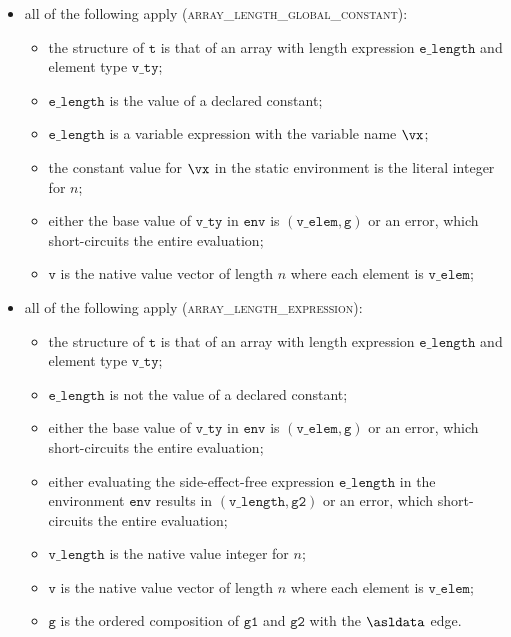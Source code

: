 \documentclass{book}
\newcommand\env[0]{\texttt{env}}
\newcommand\vg[0]{\texttt{g}}
\newcommand\vv[0]{\texttt{v}}
\newcommand\vt[0]{\texttt{t}}
\newcommand\vgone[0]{\texttt{g1}}
\newcommand\vgtwo[0]{\texttt{g2}}
\newcommand\elength[0]{\texttt{e\_length}}
\newcommand\vlength[0]{\texttt{v\_length}}
\newcommand\vvty[0]{\texttt{v\_ty}}
\newcommand\velem[0]{\texttt{v\_elem}}
\begin{document}
\begin{itemize}
  \item all of the following apply (\textsc{array\_length\_global\_constant}):
  \begin{itemize}
    \item the structure of $\vt$ is that of an array with length expression $\elength$ and element type $\vvty$;
    \item $\elength$ is the value of a declared constant;
    \item $\elength$ is a variable expression with the variable name $\vx$;
    \item the constant value for $\vx$ in the static environment is the literal integer for $n$;
    \item either the base value of $\vvty$ in $\env$ is $(\velem, \vg)$ or an error, which short-circuits
    the entire evaluation;
    \item $\vv$ is the native value vector of length $n$ where each element is $\velem$;
  \end{itemize}

  \item all of the following apply (\textsc{array\_length\_expression}):
  \begin{itemize}
    \item the structure of $\vt$ is that of an array with length expression $\elength$ and element type $\vvty$;
    \item $\elength$ is not the value of a declared constant;
    \item either the base value of $\vvty$ in $\env$ is $(\velem, \vg)$ or an error, which short-circuits
    the entire evaluation;
    \item either evaluating the side-effect-free expression $\elength$ in the environment $\env$
    results in $(\vlength, \vgtwo)$ or an error, which short-circuits
    the entire evaluation;
    \item $\vlength$ is the native value integer for $n$;
    \item $\vv$ is the native value vector of length $n$ where each element is $\velem$;
    \item $\vg$ is the ordered composition of $\vgone$ and $\vgtwo$ with the $\asldata$ edge.
  \end{itemize}
\end{itemize}
\end{document}
